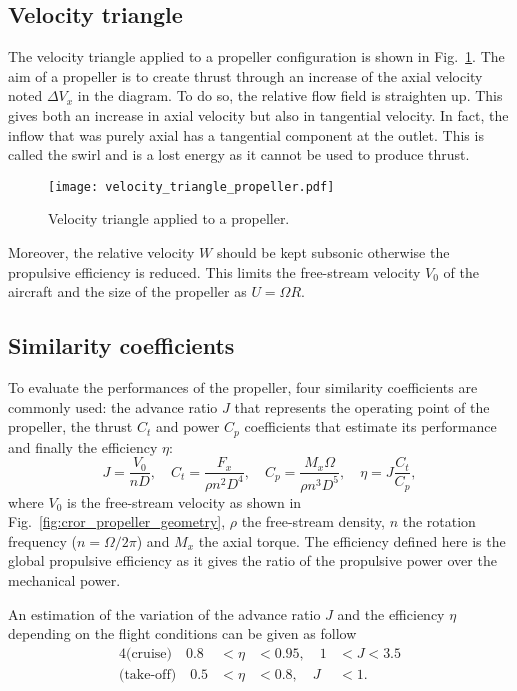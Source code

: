 \subsection{Velocity triangle}
\label{sub:cror_propeller_velocity_triangle}
The velocity triangle applied to a propeller configuration
is shown in Fig.~\ref{fig:cror_velocity_triangle_propeller}.
The aim of a propeller is to create thrust through an increase
of the axial velocity noted $\Delta V_x$ in the diagram. To do
so, the relative flow field is straighten up. This gives both
an increase in axial velocity but also in tangential velocity.
In fact, the inflow that was purely axial has a tangential
component at the outlet. This is called the swirl and
is a lost energy as it cannot be used to produce thrust.
\begin{figure}[htbp]
  \centering
  \texttt{[image: velocity\_triangle\_propeller.pdf]}
  \caption{Velocity triangle applied to a propeller.}
  \label{fig:cror_velocity_triangle_propeller}
\end{figure}
Moreover, the relative velocity $W$ should be kept subsonic
otherwise the propulsive efficiency is reduced. This limits
the free-stream velocity $V_0$ of the aircraft and the size of 
the propeller as $U = \Omega R$.

\subsection{Similarity coefficients}
\label{sub:similarity_coefficients}
To evaluate the performances of the propeller, four similarity
coefficients are commonly used:
the advance ratio $J$ that represents the operating point of the propeller,
the thrust $C_t$ and power $C_p$ coefficients that estimate its performance and finally
the efficiency $\eta$:
\begin{equation}
    J = \frac{V_0}{n D}, \quad
    C_t = \frac{F_x}{\rho n ^ 2  D ^ 4}, \quad
    C_p = \frac{M_x \Omega}{\rho n ^ 3 D ^ 5}, \quad
    \eta = J \frac{C_t}{C_p},
\end{equation}
where $V_0$ is the free-stream velocity 
as shown in Fig.~\ref{fig:cror_propeller_geometry},
$\rho$ the free-stream density,
$n$ the rotation frequency ($n = \Omega / 2 \pi$) and
$M_x$ the axial torque.
The efficiency defined here is the global propulsive efficiency
as it gives the ratio of the propulsive power over the mechanical power.

An estimation of the variation of the advance ratio $J$ and the 
efficiency $\eta$ depending on the flight conditions can be given as follow
\begin{alignat}{4}
    \text{(cruise)} \quad  0.8 &< \eta &< 0.95, \quad 1 &< J < 3.5 \\
    \text{(take-off)} \quad  0.5 &< \eta &< 0.8, \quad J &< 1.
\end{alignat}

